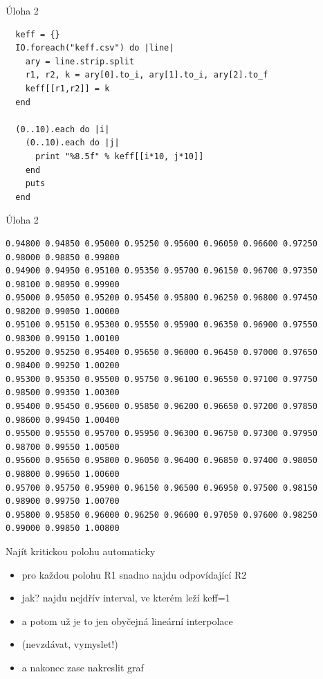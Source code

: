 \documentclass{beamer}
\begin{document}
\begin{frame}[fragile]{Úloha 2}
    \scriptsize
\begin{verbatim}
  keff = {}
  IO.foreach("keff.csv") do |line|
    ary = line.strip.split
    r1, r2, k = ary[0].to_i, ary[1].to_i, ary[2].to_f
    keff[[r1,r2]] = k
  end

  (0..10).each do |i|
    (0..10).each do |j|
      print "%8.5f" % keff[[i*10, j*10]]
    end
    puts
  end
\end{verbatim}
\end{frame}


\begin{frame}[fragile]{Úloha 2}
    \scriptsize
\begin{verbatim}
0.94800 0.94850 0.95000 0.95250 0.95600 0.96050 0.96600 0.97250 0.98000 0.98850 0.99800
0.94900 0.94950 0.95100 0.95350 0.95700 0.96150 0.96700 0.97350 0.98100 0.98950 0.99900
0.95000 0.95050 0.95200 0.95450 0.95800 0.96250 0.96800 0.97450 0.98200 0.99050 1.00000
0.95100 0.95150 0.95300 0.95550 0.95900 0.96350 0.96900 0.97550 0.98300 0.99150 1.00100
0.95200 0.95250 0.95400 0.95650 0.96000 0.96450 0.97000 0.97650 0.98400 0.99250 1.00200
0.95300 0.95350 0.95500 0.95750 0.96100 0.96550 0.97100 0.97750 0.98500 0.99350 1.00300
0.95400 0.95450 0.95600 0.95850 0.96200 0.96650 0.97200 0.97850 0.98600 0.99450 1.00400
0.95500 0.95550 0.95700 0.95950 0.96300 0.96750 0.97300 0.97950 0.98700 0.99550 1.00500
0.95600 0.95650 0.95800 0.96050 0.96400 0.96850 0.97400 0.98050 0.98800 0.99650 1.00600
0.95700 0.95750 0.95900 0.96150 0.96500 0.96950 0.97500 0.98150 0.98900 0.99750 1.00700
0.95800 0.95850 0.96000 0.96250 0.96600 0.97050 0.97600 0.98250 0.99000 0.99850 1.00800
\end{verbatim}
\end{frame}

\begin{frame}{Najít kritickou polohu automaticky}
  \begin{itemize}
    \item pro každou polohu R1 snadno najdu odpovídající R2
    \item jak? najdu nejdřív interval, ve kterém leží keff=1
    \item a potom už je to jen obyčejná lineární interpolace
    \item (nevzdávat, vymyslet!)
    \item a nakonec zase nakreslit graf
  \end{itemize}
\end{frame}
\end{document}
